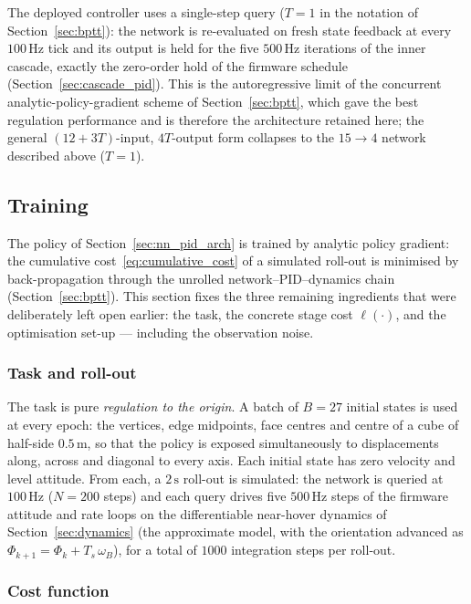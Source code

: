 \documentclass[11pt,a4paper]{article}
\theoremstyle{remark}
\numberwithin{equation}{section}
\begin{document}
The deployed controller uses a single-step query ($T = 1$ in the notation of
Section~\ref{sec:bptt}): the network is re-evaluated on fresh state feedback at
every $100\,\mathrm{Hz}$ tick and its output is held for the five $500\,\mathrm{Hz}$
iterations of the inner cascade, exactly the zero-order hold of the firmware
schedule (Section~\ref{sec:cascade_pid}). This is the autoregressive limit of the
concurrent analytic-policy-gradient scheme of Section~\ref{sec:bptt}, which gave
the best regulation performance and is therefore the architecture retained here;
the general $(12 + 3T)$-input, $4T$-output form collapses to the
$15 \to 4$ network described above ($T = 1$).

\subsection{Training}\label{sec:nn_training}

The policy of Section~\ref{sec:nn_pid_arch} is trained by analytic policy
gradient: the cumulative cost~\eqref{eq:cumulative_cost} of a simulated
roll-out is minimised by back-propagation through the unrolled
network--PID--dynamics chain (Section~\ref{sec:bptt}). This section fixes the
three remaining ingredients that were deliberately left open earlier: the task,
the concrete stage cost $\ell(\cdot)$, and the optimisation set-up --- including
the observation noise.

\subsubsection*{Task and roll-out}

The task is pure \emph{regulation to the origin}. A batch of $B = 27$ initial
states is used at every epoch: the vertices, edge midpoints, face centres and
centre of a cube of half-side $0.5\,\mathrm{m}$, so that the policy is exposed
simultaneously to displacements along, across and diagonal to every axis. Each
initial state has zero velocity and level attitude. From each, a
$2\,\mathrm{s}$ roll-out is simulated: the network is queried at
$100\,\mathrm{Hz}$ ($N = 200$ steps) and each query drives five
$500\,\mathrm{Hz}$ steps of the firmware attitude and rate loops on the
differentiable near-hover dynamics of Section~\ref{sec:dynamics} (the approximate
model, with the orientation advanced as $\Phi_{k+1} = \Phi_k + T_s\,\omega_B$),
for a total of $1000$ integration steps per roll-out.

\subsubsection*{Cost function}
\end{document}
